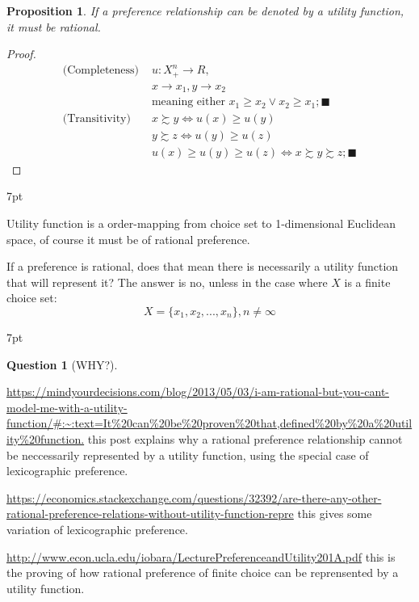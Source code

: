 \documentclass{article}
\newenvironment{greenblock}{%
\def\FrameCommand{%
  \hspace{1pt}%
    {\color{Green}%
    \vrule width 2pt}%
    {\color{greenshade}%
    \vrule width 4pt}%
  \colorbox{greenshade}%
}%
\MakeFramed{%
  \advance%
  \hsize-%
  \width%
  \FrameRestore}%
\noindent\hspace{-4.55pt}%
\begin{adjustwidth}{}{7pt}%
\vspace{2pt}\vspace{2pt}%
}
{%
\vspace{2pt}\end{adjustwidth}\endMakeFramed%
}
\newenvironment{redblock}{
\def\FrameCommand{
  \hspace{1pt}
    {\color{LightCoral}
    \vrule width 2pt}
    {\color{redshade}
    \vrule width 4pt}
  \colorbox{redshade}
}
\MakeFramed{
  \advance
  \hsize-
  \width
  \FrameRestore}
\noindent\hspace{-4.55pt}%
\begin{adjustwidth}{}{7pt}
\vspace{2pt}\vspace{2pt}
}
{\vspace{2pt}\end{adjustwidth}\endMakeFramed}
\newtheorem{question}{Question}
\newtheorem{proposition}{Proposition}
\begin{document}
\begin{proposition}
If a preference relationship can be denoted by a utility function, it must be rational.
\end{proposition}


\begin{proof}
\begin{align}
\text{(Completeness) }&u: X_{+}^{n} \rightarrow R,
\\&x \rightarrow x_{1}, y \rightarrow x_{2}
\\&\text{meaning  either } x_{1} \geqslant x_{2} \lor x_{2} \geqslant x_{1};\blacksquare
\\\text{(Transitivity) }&x\succsim y\iff u(x)\geqslant u(y)
\\&y\succsim z\iff u(y)\geqslant u(z)
\\&u(x)\geqslant u(y)\geqslant u(z) \iff x\succsim y \succsim z;\blacksquare
\end{align}
\end{proof}

\begin{greenblock}
Utility function is a order-mapping from choice set to 1-dimensional Euclidean space, of course it must be of rational preference.
\end{greenblock}


If a preference is rational, does that mean there is necessarily a utility function that will represent it?
The answer is no, unless in the case where $X$ is a finite choice set: 
$$X=\{x_{1},x_{2},...,x_{n}\},n\neq \infty$$
\begin{redblock}
\begin{question}[WHY?]
\end{question}
\url{https://mindyourdecisions.com/blog/2013/05/03/i-am-rational-but-you-cant-model-me-with-a-utility-function/#:~:text=It%20can%20be%20proven%20that,defined%20by%20a%20utility%20function.}
this post explains why a rational preference relationship cannot be neccessarily represented by a utility function, using the special case of lexicographic preference.

\url{https://economics.stackexchange.com/questions/32392/are-there-any-other-rational-preference-relations-without-utility-function-repre}
this gives some variation of lexicographic preference.

\url{http://www.econ.ucla.edu/iobara/LecturePreferenceandUtility201A.pdf}
this is the proving of how rational preference of finite choice can be reprensented by a utility function.
\end{redblock}
\end{document}
